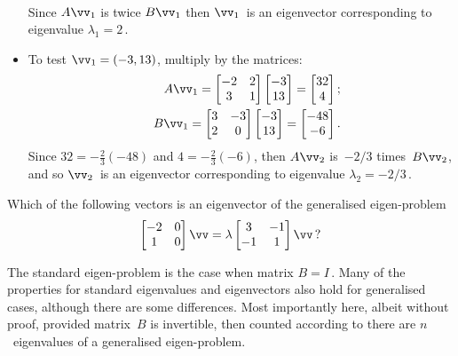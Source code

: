 \begin{example}
\begin{solution}
\begin{itemize}
\begin{eqnarray*}
\end{eqnarray*}
Since \(A\vv_1\) is twice \(B\vv_1\) then \(\vv_1\)~is an eigenvector corresponding to eigenvalue \(\lambda_1=2\)\,.
\item To test \(\vv_1=(-3,13)\), multiply by the matrices:
\begin{eqnarray*}
&&A\vv_1=\begin{bmatrix} -2&2\\3&1 \end{bmatrix}\begin{bmatrix} -3\\13 \end{bmatrix}
=\begin{bmatrix} 32\\4 \end{bmatrix};
\\&&B\vv_1=\begin{bmatrix} 3&-3\\2&0 \end{bmatrix}\begin{bmatrix} -3\\13 \end{bmatrix}
=\begin{bmatrix} -48\\-6 \end{bmatrix}.
\end{eqnarray*}
Since \(32=-\tfrac23(-48)\) and \(4=-\tfrac23(-6)\), then \(A\vv_2\) is~\(-2/3\) times~\(B\vv_2\), and so \(\vv_2\)~is an eigenvector corresponding to eigenvalue \(\lambda_2=-2/3\)\,.
\end{itemize}
\end{solution}
\end{example}


\begin{activity}
Which of the following vectors is an eigenvector of the generalised eigen-problem
\begin{equation*}
\begin{bmatrix} -2&0\\1&0 \end{bmatrix}\vv=\lambda\begin{bmatrix} 3&-1\\-1&1 \end{bmatrix}\vv\,?
\end{equation*}
\end{activity}


The standard eigen-problem is the case when matrix \(B=I\)\,.
Many of the properties for standard eigenvalues and eigenvectors also hold for generalised cases, although there are some differences.
Most importantly here, albeit without proof, provided matrix~\(B\) is invertible, then counted according to  there are \(n\)~eigenvalues of a generalised eigen-problem.

